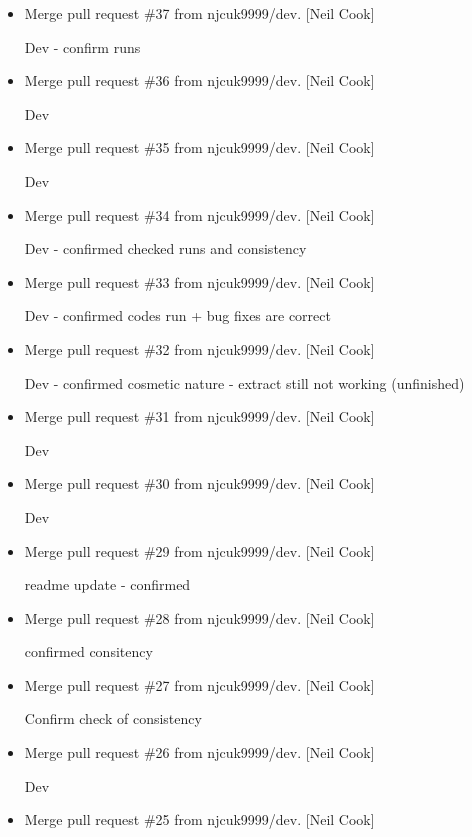 \documentclass[a4paper,10pt,english]{report}
\begin{document}
\begin{itemize}
\item {} 
Merge pull request \#37 from njcuk9999/dev. {[}Neil Cook{]}

Dev - confirm runs

\item {} 
Merge pull request \#36 from njcuk9999/dev. {[}Neil Cook{]}

Dev

\item {} 
Merge pull request \#35 from njcuk9999/dev. {[}Neil Cook{]}

Dev

\item {} 
Merge pull request \#34 from njcuk9999/dev. {[}Neil Cook{]}

Dev - confirmed checked runs and consistency

\item {} 
Merge pull request \#33 from njcuk9999/dev. {[}Neil Cook{]}

Dev - confirmed codes run + bug fixes are correct

\item {} 
Merge pull request \#32 from njcuk9999/dev. {[}Neil Cook{]}

Dev - confirmed cosmetic nature - extract still not working (unfinished)

\item {} 
Merge pull request \#31 from njcuk9999/dev. {[}Neil Cook{]}

Dev

\item {} 
Merge pull request \#30 from njcuk9999/dev. {[}Neil Cook{]}

Dev

\item {} 
Merge pull request \#29 from njcuk9999/dev. {[}Neil Cook{]}

readme update - confirmed

\item {} 
Merge pull request \#28 from njcuk9999/dev. {[}Neil Cook{]}

confirmed consitency

\item {} 
Merge pull request \#27 from njcuk9999/dev. {[}Neil Cook{]}

Confirm check of consistency

\item {} 
Merge pull request \#26 from njcuk9999/dev. {[}Neil Cook{]}

Dev

\item {} 
Merge pull request \#25 from njcuk9999/dev. {[}Neil Cook{]}


\end{itemize}
\end{document}
